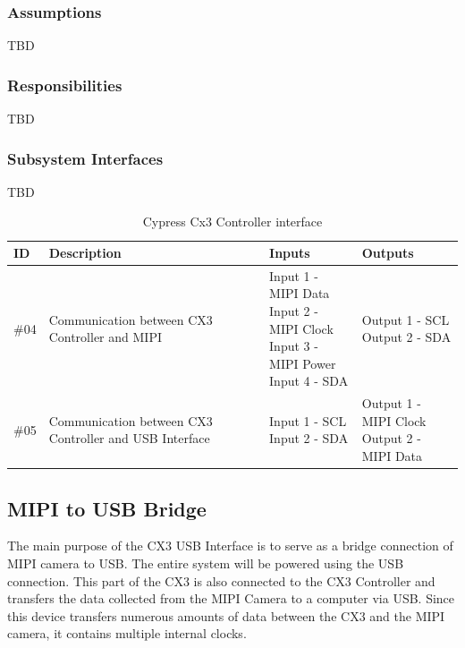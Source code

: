 \subsubsection{Assumptions}
TBD

\subsubsection{Responsibilities}
TBD

\subsubsection{Subsystem Interfaces}
TBD

\begin {table}[H]
\caption {Cypress Cx3 Controller interface}
\begin{center}
    \begin{tabular}{ | p{1cm} | p{6cm} | p{3cm} | p{3cm} |}
    \hline
    ID & Description & Inputs & Outputs \\ \hline
    \#04 & Communication between CX3 Controller and MIPI & \pbox{3cm}{Input 1 - MIPI Data \\ Input 2 - MIPI Clock \\ Input 3 - MIPI Power \\ Input 4 - SDA} & \pbox{3cm}{Output 1 - SCL \\ Output 2 - SDA}  \\ \hline
    \#05 & Communication between CX3 Controller and USB Interface & \pbox{3cm}{Input 1 - SCL \\ Input 2 - SDA} & \pbox{3cm}{Output 1 - MIPI Clock \\ Output 2 - MIPI Data}  \\ \hline
    \end{tabular}
\end{center}
\end{table}

\subsection{MIPI to USB Bridge}
The main purpose of the CX3 USB Interface is to serve as a bridge connection of MIPI camera to USB. The entire system will be powered using the USB connection. This part of the CX3 is also connected to the CX3 Controller and transfers the data collected from the MIPI Camera to a computer via USB. Since this device transfers numerous amounts of data between the CX3 and the MIPI camera, it contains multiple internal clocks.

